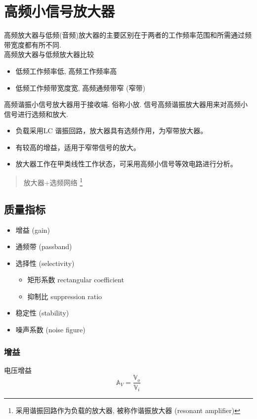 \documentclass[a4paper]{report}
\begin{document}
\chapter{高频小信号放大器}
高频放大器与低频(音频)放大器的主要区别在于两者的工作频率范围和所需通过频带宽度都有所不同. \\
高频放大器与低频放大器比较
\begin{itemize}
  \item 低频工作频率低, 高频工作频率高
  \item 低频工作频带宽度宽, 高频通频带窄 (窄带)
\end{itemize}
高频谐振小信号放大器用于接收端. 俗称小放. 信号高频谐振放大器用来对高频小信号进行选频和放大. 
\begin{itemize}
  \item 负载采用LC 谐振回路，放大器具有选频作用，为窄带放大器。
  \item 有较高的增益，适用于窄带信号的放大。
  \item 放大器工作在甲类线性工作状态，可采用高频小信号等效电路进行分析。
\end{itemize}
\begin{quotation}
  \centering
  放大器+选频网络 \footnote{采用谐振回路作为负载的放大器, 被称作谐振放大器 (resonant amplifier)}
\end{quotation}
\section{质量指标}
\begin{itemize}
  \item 增益 (gain)
  \item 通频带 (passband)
  \item 选择性 (selectivity)
  \begin{itemize}
    \item 矩形系数 rectangular coefficient
    \item 抑制比 suppression ratio
  \end{itemize}
  \item 稳定性 (stability)
  \item 噪声系数 (noise figure)
\end{itemize}
\subsection{增益}
电压增益
$$\mathbb{A}_V=\frac{\mathbb{V}_o}{\mathbb{V}_i}$$
\end{document}
